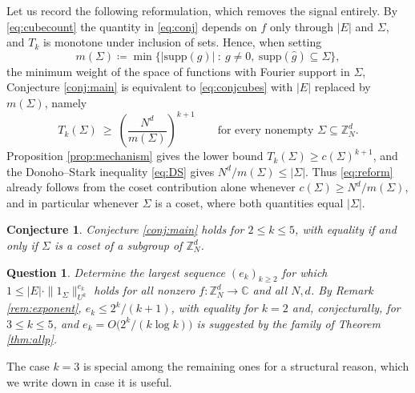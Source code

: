 \documentclass[12pt]{amsart}
\newcommand{\Z}{\mathbb{Z}}
\newcommand{\C}{\mathbb{C}}
\newcommand{\supp}{\mathrm{supp}}
\newtheorem{conjecture}[theorem]{Conjecture}
\newtheorem{question}[theorem]{Question}
\begin{document}
Let us record the following reformulation, which removes the signal entirely. By \eqref{eq:cubecount} the quantity in \eqref{eq:conj} depends on $f$ only through $|E|$ and $\Sigma$, and $T_k$ is monotone under inclusion of sets. Hence, when setting
\[
m(\Sigma)\coloneq\min\bigl\{|\supp(g)|\ :\ g\ne0,\ \supp(\hat g)\subseteq\Sigma\bigr\},
\]
the minimum weight of the space of functions with Fourier support in $\Sigma$, Conjecture \ref{conj:main} is equivalent to \eqref{eq:conjcubes} with $|E|$ replaced by $m(\Sigma)$, namely
\begin{equation}\label{eq:reform}
T_k(\Sigma)\ \ge\ \left(\frac{N^d}{m(\Sigma)}\right)^{k+1}
\qquad\text{for every nonempty }\Sigma\subseteq\Z_N^d .
\end{equation}
Proposition \ref{prop:mechanism} gives the lower bound $T_k(\Sigma)\ge c(\Sigma)^{k+1}$, and the Donoho--Stark inequality \eqref{eq:DS} gives $N^d/m(\Sigma)\le|\Sigma|$. Thus \eqref{eq:reform} already follows from the coset contribution alone whenever $c(\Sigma)\ge N^d/m(\Sigma)$, and in particular whenever $\Sigma$ is a coset, where both quantities equal $|\Sigma|$. 

\begin{conjecture}\label{conj:restricted}
Conjecture \ref{conj:main} holds for $2\le k\le 5$, with equality if and only if $\Sigma$ is a coset of a subgroup of $\Z_N^d$.
\end{conjecture}

\begin{question}\label{q:exponent}
Determine the largest sequence $(e_k)_{k\ge2}$ for which $1\le|E|\cdot\|1_\Sigma\|_{U^k}^{e_k}$ holds for all nonzero $f:\Z_N^d\to\C$ and all $N,d$. By Remark \ref{rem:exponent}, $e_k\le 2^k/(k+1)$, with equality for $k=2$ and, conjecturally, for $3\le k\le5$, and $e_k=O\bigl(2^k/(k\log k)\bigr)$ is suggested by the family of Theorem \ref{thm:allp}.
\end{question}

The case $k=3$ is special among the remaining ones for a structural reason, which we write down in case it is useful.
\end{document}
